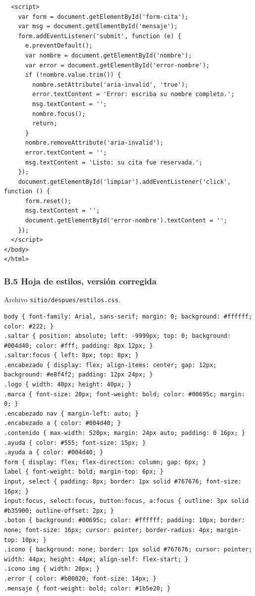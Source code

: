 \documentclass[10pt,letterpaper,onecolumn]{IEEEtran}
\begin{document}
\begin{lstlisting}
  <script>
    var form = document.getElementById('form-cita');
    var msg = document.getElementById('mensaje');
    form.addEventListener('submit', function (e) {
      e.preventDefault();
      var nombre = document.getElementById('nombre');
      var error = document.getElementById('error-nombre');
      if (!nombre.value.trim()) {
        nombre.setAttribute('aria-invalid', 'true');
        error.textContent = 'Error: escriba su nombre completo.';
        msg.textContent = '';
        nombre.focus();
        return;
      }
      nombre.removeAttribute('aria-invalid');
      error.textContent = '';
      msg.textContent = 'Listo: su cita fue reservada.';
    });
    document.getElementById('limpiar').addEventListener('click', function () {
      form.reset();
      msg.textContent = '';
      document.getElementById('error-nombre').textContent = '';
    });
  </script>
</body>
</html>
\end{lstlisting}

\subsubsection{B.5 Hoja de estilos, versión corregida}\label{b.5-hoja-de-estilos-versiuxf3n-corregida}

Archivo \texttt{sitio/\allowbreak{}\allowbreak{}despues/\allowbreak{}\allowbreak{}estilos.\allowbreak{}\allowbreak{}css}.

\begin{lstlisting}
body { font-family: Arial, sans-serif; margin: 0; background: #ffffff; color: #222; }
.saltar { position: absolute; left: -9999px; top: 0; background: #004d40; color: #fff; padding: 8px 12px; }
.saltar:focus { left: 8px; top: 8px; }
.encabezado { display: flex; align-items: center; gap: 12px; background: #e8f4f2; padding: 12px 24px; }
.logo { width: 40px; height: 40px; }
.marca { font-size: 20px; font-weight: bold; color: #00695c; margin: 0; }
.encabezado nav { margin-left: auto; }
.encabezado a { color: #004d40; }
.contenido { max-width: 520px; margin: 24px auto; padding: 0 16px; }
.ayuda { color: #555; font-size: 15px; }
.ayuda a { color: #004d40; }
form { display: flex; flex-direction: column; gap: 6px; }
label { font-weight: bold; margin-top: 6px; }
input, select { padding: 8px; border: 1px solid #767676; font-size: 16px; }
input:focus, select:focus, button:focus, a:focus { outline: 3px solid #b35900; outline-offset: 2px; }
.boton { background: #00695c; color: #ffffff; padding: 10px; border: none; font-size: 16px; cursor: pointer; border-radius: 4px; margin-top: 10px; }
.icono { background: none; border: 1px solid #767676; cursor: pointer; width: 44px; height: 44px; align-self: flex-start; }
.icono img { width: 20px; }
.error { color: #b00020; font-size: 14px; }
.mensaje { font-weight: bold; color: #1b5e20; }
\end{lstlisting}
\end{document}
